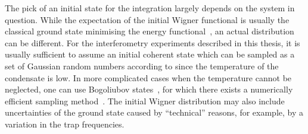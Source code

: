 The pick of an initial state for the integration largely depends on the system in question.
While the expectation of the initial Wigner functional is usually the classical ground state minimising the energy functional~, an actual distribution can be different.
For the interferometry experiments described in this thesis, it is usually sufficient to assume an initial coherent state which can be sampled as a set of Gaussian random numbers according to  since the temperature of the condensate is low.
In more complicated cases when the temperature cannot be neglected, one can use Bogoliubov states~\cite{Blakie2008,Ruostekoski2010}, for which there exists a numerically efficient sampling method~\cite{Sinatra2002}.
The initial Wigner distribution may also include uncertainties of the ground state caused by ``technical'' reasons, for example, by a variation in the trap frequencies.
